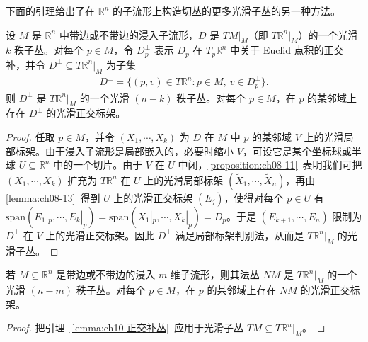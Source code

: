 \documentclass[../../main.tex]{subfiles}
\begin{document}
下面的引理给出了在 $\mathbb{R}^n$ 的子流形上构造切丛的更多光滑子丛的另一种方法。

\begin{lemma}[正交补丛]\label{lemma:ch10-正交补丛}
设 $M$ 是 $\mathbb{R}^n$ 中带边或不带边的浸入子流形，$D$ 是 $TM|_M$（即 $T\mathbb{R}^n|_M$）的一个光滑 $k$ 秩子丛。对每个 $p\in M$，令 $D_p^\perp$ 表示 $D_p$ 在 $T_p\mathbb{R}^n$ 中关于 Euclid 点积的正交补，并令 $D^\perp\subseteq T\mathbb{R}^n|_M$ 为子集
\begin{align*}
D^\perp=\{(p,v)\in T\mathbb{R}^n:p\in M,\ v\in D_p^\perp\}.
\end{align*}
则 $D^\perp$ 是 $T\mathbb{R}^n|_M$ 的一个光滑 $(n-k)$ 秩子丛。对每个 $p\in M$，在 $p$ 的某邻域上存在 $D^\perp$ 的光滑正交标架。
\end{lemma}

\begin{proof}
任取 $p\in M$，并令 $(X_1,\cdots ,X_k)$ 为 $D$ 在 $M$ 中 $p$ 的某邻域 $V$ 上的光滑局部标架。由于浸入子流形是局部嵌入的，必要时缩小 $V$，可设它是某个坐标球或半球 $U\subseteq\mathbb{R}^n$ 中的一个切片。由于 $V$ 在 $U$ 中闭，\cref{proposition:ch08-11}~表明我们可把 $(X_1,\cdots ,X_k)$ 扩充为 $T\mathbb{R}^n$ 在 $U$ 上的光滑局部标架 $(\widetilde X_1,\cdots ,\widetilde X_n)$，再由\cref{lemma:ch08-13}~得到 $U$ 上的光滑正交标架 $(E_j)$，使得对每个 $p\in U$ 有 $\mathrm{span}(E_1|_p,\cdots ,E_k|_p)=\mathrm{span}(X_1|_p,\cdots ,X_k|_p)=D_p$。于是 $(E_{k+1},\cdots ,E_n)$ 限制为 $D^\perp$ 在 $V$ 上的光滑正交标架。因此 $D^\perp$ 满足局部标架判别法，从而是 $T\mathbb{R}^n|_M$ 的光滑子丛。
\end{proof}

\begin{corollary}\label{corollary:ch10-法丛}
若 $M\subseteq\mathbb{R}^n$ 是带边或不带边的浸入 $m$ 维子流形，则其法丛 $NM$ 是 $T\mathbb{R}^n|_M$ 的一个光滑 $(n-m)$ 秩子丛。对每个 $p\in M$，在 $p$ 的某邻域上存在 $NM$ 的光滑正交标架。
\end{corollary}

\begin{proof}
把引理~\ref{lemma:ch10-正交补丛}~应用于光滑子丛 $TM\subseteq T\mathbb{R}^n|_M$。
\end{proof}
\end{document}
